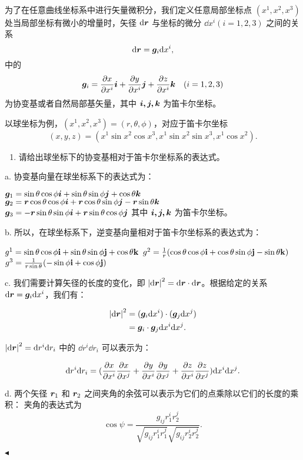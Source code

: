 \documentclass[11pt]{article}
\newenvironment{question}[2][Question]{\begin{trivlist}
\item[\hskip \labelsep {\bfseries #1}\hskip \labelsep {\bfseries #2.}]}{\hfill$\blacktriangleleft$\end{trivlist}}
\begin{document}
    \begin{question}{4 (16') (度量张量)}~
    
    为了在任意曲线坐标系中进行矢量微积分，我们定义任意局部坐标点 $(x^1, x^2, x^3)$ 处当局部坐标有微小的增量时，矢径 $\dd \vb*{r}$ 与坐标的微分 $\dd x^i (i = 1, 2, 3)$ 之间的关系
    \[ \dd \vb*{r} = \vb*{g}_i \dd x^i, \]
    中的
    \[ \vb*{g}_i = \pdv{x}{x^i} \vb*{i} + \pdv{y}{x^i} \vb*{j} + \pdv{z}{x^i} \vb*{k} \quad (i = 1, 2, 3) \]
    为协变基或者自然局部基矢量，其中 $\vb*{i, j, k}$ 为笛卡尔坐标。
    
    以球坐标为例，$(x^1, x^2, x^3) = (r, \theta, \phi)$，对应于笛卡尔坐标
    \[ (x, y, z) = (x^1 \sin x^2 \cos x^3, x^1 \sin x^2 \sin x^3, x^1 \cos x^2). \]
    
    \begin{enumerate}
        \item [a (4')] 请给出球坐标下的协变基相对于笛卡尔坐标系的表达式。
    \end{enumerate}

    a. 协变基向量在球坐标系下的表达式为：
    

    $\vb*{g}_1 = \sin\theta \cos\phi \vb*{i} + \sin\theta \sin\phi \vb*{j} + \cos\theta \vb*{k}$ \\
    $\vb*{g}_2 = \vb*{r} \cos\theta \cos\phi \vb*{i} + \vb*{r} \cos\theta \sin\phi \vb*{j} - \vb*{r} \sin\theta \vb*{k}$ \\
    $\vb*{g}_3 = -\vb*{r} \sin\theta \sin\phi \vb*{i} + \vb*{r} \sin\theta \cos\phi \vb*{j}$ \quad \quad
    其中 $\vb*{i, j, k}$ 为笛卡尔坐标。 
    
    b.
    所以，在球坐标系下，逆变基向量相对于笛卡尔坐标系的表达式为：

    $g^1 = \sin\theta \cos\phi \mathbf{i} + \sin\theta \sin\phi \mathbf{j} + \cos\theta \mathbf{k} \\$
    $g^2 = \frac{1}{r} ( \cos\theta \cos\phi \mathbf{i} +  \cos\theta \sin\phi \mathbf{j} -  \sin\theta \mathbf{k}) \\$
    $g^3 = \frac{1}{r \sin\theta} (- \sin\phi \mathbf{i} +   \cos\phi \mathbf{j}) \\$


    c. 我们需要计算矢径的长度的变化，即 $\abs{\dd \vb*{r}}^2 = \dd \vb*{r} \cdot \dd \vb*{r}$。根据给定的关系 $\dd \vb*{r} = \vb*{g}_i \dd x^i$，我们有：

    \[\begin{split} \abs{\dd \vb*{r}}^2 &= (\vb*{g}_i \dd x^i) \cdot (\vb*{g}_j \dd x^j) \\
    &= \vb*{g}_i \cdot \vb*{g}_j \dd x^i \dd x^j. \end{split}\]

    $\abs{\dd \vb*{r}}^2 = \dd r^i \dd r_i$ 中的 $\dd r^i \dd r_i$ 可以表示为：

    \[ \dd r^i \dd r_i = (\pdv{x}{x^i} \pdv{x}{x^j} + \pdv{y}{x^i} \pdv{y}{x^j} + \pdv{z}{x^i} \pdv{z}{x^j}) \dd x^i \dd x^j. \]

    d. 两个矢径 $\vb*{r}_1$ 和 $\vb*{r}_2$ 之间夹角的余弦可以表示为它们的点乘除以它们的长度的乘积：
    夹角的表达式为
    \[\cos \psi = \frac{g_{ij} r_1^i r_2^j}{\sqrt{g_{ij} r_1^i r_1^j} \sqrt{g_{ij} r_2^i r_2^j}}.\]

    \end{question}
\end{document}
